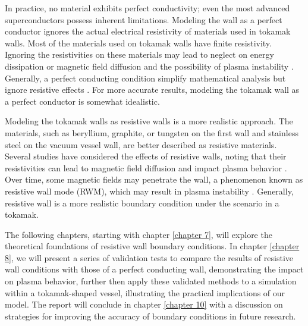 In practice, no material exhibits perfect conductivity; even the most advanced superconductors possess inherent limitations. Modeling the wall as a perfect conductor ignores the actual electrical resistivity of materials used in tokamak walls. Most of the materials used on tokamak walls have finite resistivity. Ignoring the resistivities on these materials may lead to neglect on energy dissipation or magnetic field diffusion and the possibility of plasma instability \cite{pustovitov2017computation}. Generally, a perfect conducting condition simplify mathematical analysis but ignore resistive effects \cite{bondeson2003physics}. For more accurate results, modeling the tokamak wall as a perfect conductor is somewhat idealistic.

Modeling the tokamak walls as resistive walls is a more realistic approach. The materials, such as beryllium, graphite, or tungsten on the first wall and stainless steel on the vacuum vessel wall, are better described as resistive materials. Several studies have considered the effects of resistive walls, noting that their resistivities can lead to magnetic field diffusion and impact plasma behavior \cite{chrysanthou2020, ferraro2016multi, becerra2016resistive}. Over time, some magnetic fields may penetrate the wall, a phenomenon known as resistive wall mode (RWM), which may result in plasma instability \cite{clauser2021iter,bondeson2003physics}. Generally, resistive wall is a more realistic boundary condition under the scenario in a tokamak.

The following chapters, starting with chapter \ref{chapter 7}, will explore the theoretical foundations of resistive wall boundary conditions. In chapter \ref{chapter 8}, we will present a series of validation tests to compare the results of resistive wall conditions with those of a perfect conducting wall, demonstrating the impact on plasma behavior, further then apply these validated methods to a simulation within a tokamak-shaped vessel, illustrating the practical implications of our model. The report will conclude in chapter \ref{chapter 10} with a discussion on strategies for improving the accuracy of boundary conditions in future research.

 

 
